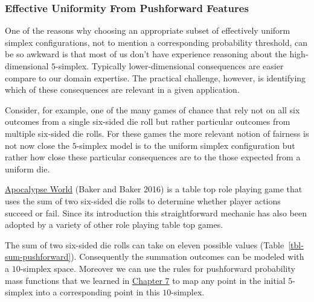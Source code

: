 \documentclass[
  letterpaper,
  DIV=11,
  numbers=noendperiod]{scrartcl}
\begin{document}
\subsubsection{Effective Uniformity From Pushforward
Features}\label{sec:effective_pushforward}

One of the reasons why choosing an appropriate subset of effectively
uniform simplex configurations, not to mention a corresponding
probability threshold, can be so awkward is that most of us don't have
experience reasoning about the high-dimensional \(5\)-simplex. Typically
lower-dimensional consequences are easier compare to our domain
expertise. The practical challenge, however, is identifying which of
these consequences are relevant in a given application.

Consider, for example, one of the many games of chance that rely not on
all six outcomes from a single six-sided die roll but rather particular
outcomes from multiple six-sided die rolls. For these games the more
relevant notion of fairness is not now close the \(5\)-simplex model is
to the uniform simplex configuration but rather how close these
particular consequences are to the those expected from a uniform die.

\href{http://apocalypse-world.com}{Apocalypse World} (Baker and Baker
2016) is a table top role playing game that uses the sum of two
six-sided die rolls to determine whether player actions succeed or fail.
Since its introduction this straightforward mechanic has also been
adopted by a variety of other role playing table top games.

The sum of two six-sided die rolls can take on eleven possible values
(Table~\ref{tbl-sum-pushforward}). Consequently the summation outcomes
can be modeled with a \(10\)-simplex space. Moreover we can use the
rules for pushforward probability mass functions that we learned in
\href{https://betanalpha.github.io/assets/chapters_html/transforming_probability_spaces.html\#transforming-probability-mass-functions}{Chapter
7} to map any point in the initial \(5\)-simplex into a corresponding
point in this \(10\)-simplex.
\end{document}

